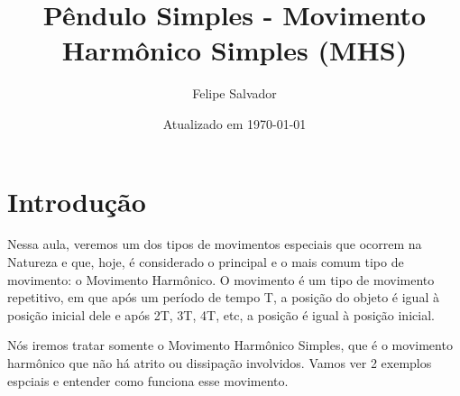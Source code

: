 \documentclass[12pt]{extarticle}
\title{Pêndulo Simples - Movimento Harmônico Simples (MHS)}
\author{Felipe Salvador}
\date{Atualizado em \today}
\newcommand{\<}{\langle}
\renewcommand{\>}{\rangle}
\theoremstyle{definition}
\begin{document}
\maketitle

\section{Introdução}

Nessa aula, veremos um dos tipos de movimentos especiais que ocorrem na Natureza e que, hoje, é considerado o principal e o mais comum tipo de movimento: o Movimento Harmônico. O movimento é um tipo de movimento repetitivo, em que após um período de tempo T, a posição do objeto é igual à posição inicial dele e após 2T, 3T, 4T, etc, a posição é igual à posição inicial.

Nós iremos tratar somente o Movimento Harmônico Simples, que é o movimento harmônico que não há atrito ou dissipação involvidos. Vamos ver 2 exemplos espciais e entender como funciona esse movimento.
\end{document}
